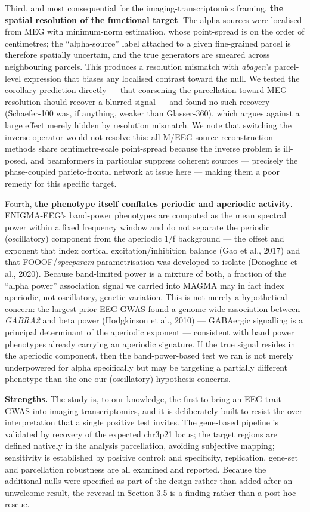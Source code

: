 \documentclass[
  11pt,
  letterpaper,
]{article}
\begin{document}
Third, and most consequential for the imaging-transcriptomics framing,
\textbf{the spatial resolution of the functional target}. The alpha
sources were localised from MEG with minimum-norm estimation, whose
point-spread is on the order of centimetres; the ``alpha-source'' label
attached to a given fine-grained parcel is therefore spatially
uncertain, and the true generators are smeared across neighbouring
parcels. This produces a resolution mismatch with \emph{abagen}'s
parcel-level expression that biases any localised contrast toward the
null. We tested the corollary prediction directly --- that coarsening
the parcellation toward MEG resolution should recover a blurred signal
--- and found no such recovery (Schaefer-100 was, if anything, weaker
than Glasser-360), which argues against a large effect merely hidden by
resolution mismatch. We note that switching the inverse operator would
not resolve this: all M/EEG source-reconstruction methods share
centimetre-scale point-spread because the inverse problem is ill-posed,
and beamformers in particular suppress coherent sources --- precisely
the phase-coupled parieto-frontal network at issue here --- making them
a poor remedy for this specific target.

Fourth, \textbf{the phenotype itself conflates periodic and aperiodic
activity}. ENIGMA-EEG's band-power phenotypes are computed as the mean
spectral power within a fixed frequency window and do not separate the
periodic (oscillatory) component from the aperiodic 1/f background ---
the offset and exponent that index cortical excitation/inhibition
balance (Gao et al., 2017) and that FOOOF/\emph{specparam}
parametrisation was developed to isolate (Donoghue et al., 2020).
Because band-limited power is a mixture of both, a fraction of the
``alpha power'' association signal we carried into MAGMA may in fact
index aperiodic, not oscillatory, genetic variation. This is not merely
a hypothetical concern: the largest prior EEG GWAS found a genome-wide
association between \emph{GABRA2} and beta power (Hodgkinson et al.,
2010) --- GABAergic signalling is a principal determinant of the
aperiodic exponent --- consistent with band power phenotypes already
carrying an aperiodic signature. If the true signal resides in the
aperiodic component, then the band-power-based test we ran is not merely
underpowered for alpha specifically but may be targeting a partially
different phenotype than the one our (oscillatory) hypothesis concerns.

\textbf{Strengths.} The study is, to our knowledge, the first to bring
an EEG-trait GWAS into imaging transcriptomics, and it is deliberately
built to resist the over-interpretation that a single positive test
invites. The gene-based pipeline is validated by recovery of the
expected chr3p21 locus; the target regions are defined natively in the
analysis parcellation, avoiding subjective mapping; sensitivity is
established by positive control; and specificity, replication, gene-set
and parcellation robustness are all examined and reported. Because the
additional nulls were specified as part of the design rather than added
after an unwelcome result, the reversal in Section 3.5 is a finding
rather than a post-hoc rescue.
\end{document}
